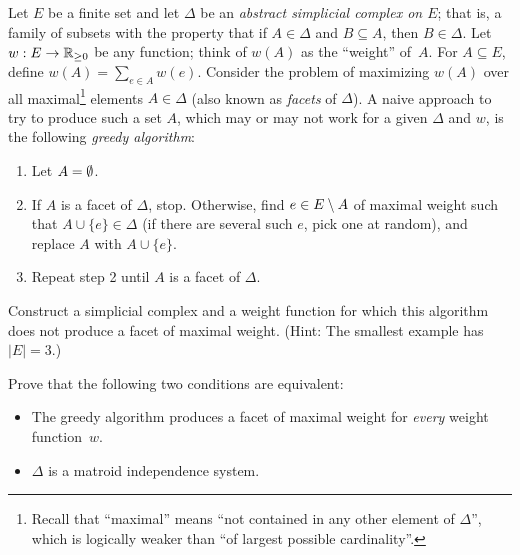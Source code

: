\prob Let $E$ be a finite set and let $\Delta$ be an \emph{abstract simplicial complex on $E$};
that is, a family of subsets with the property that if $A\in\Delta$ and $B\subseteq A$, then
$B\in\Delta$.  Let $w:E\to\mathbb{R}_{\geq 0}$ be any function; think of $w(A)$ as the ``weight'' of~$A$.
For $A\subseteq E$, define $w(A)=\sum_{e\in A} w(e)$.
Consider the problem of maximizing $w(A)$ over all maximal\footnote[2]{%
  Recall that ``maximal'' means ``not contained in any other element of $\Delta$'',
  which is logically weaker than ``of largest possible cardinality''.}
elements $A\in\Delta$
(also known as \emph{facets} of $\Delta$).  A naive approach
to try to produce such a set $A$, which may or may
not work for a given $\Delta$ and $w$, is the following \emph{greedy algorithm}:
\begin{enumerate}
\item Let $A=\emptyset$.
\item If $A$ is a facet of $\Delta$, stop.
Otherwise, find $e\in E\setminus A$ of maximal weight such that $A\cup\{e\}\in\Delta$
   (if there are several such $e$, pick one at random), and replace $A$ with $A\cup\{e\}$.
\item Repeat step 2 until $A$ is a facet of $\Delta$.
\end{enumerate}

\probpart Construct a simplicial complex and a weight function for which this
  algorithm does not produce a facet of maximal weight.  (Hint: The smallest example 
has $|E|=3$.)

\probpart Prove that the following two conditions are equivalent:
\begin{itemize}
\item The greedy algorithm produces a facet of maximal weight for \emph{every} weight function~$w$.
\item $\Delta$ is a matroid independence system.
\end{itemize}


